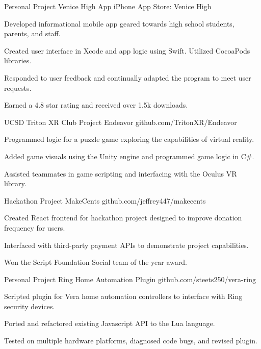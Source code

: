 \documentclass[]{awesome-cv}
\begin{document}
\vspace{-5mm}


\begin{cventries}
	\cventry
	{Personal Project}
	{Venice High App}
	{}
	{iPhone App Store: \textquotedbl{}Venice High\textquotedbl{}}
	{\begin{cvitems}
		\item {Developed informational mobile app geared towards high school students, parents, and staff.}
		\item {Created user interface in Xcode and app logic using Swift. Utilized CocoaPods libraries.}
		\item {Responded to user feedback and continually adapted the program to meet user requests.}
		\item {Earned a 4.8 star rating and received over 1.5k downloads.}
		\end{cvitems}}
	\cventry
	{UCSD Triton XR Club Project}
	{Endeavor}
	{}
	{github.com/TritonXR/Endeavor}
	{\begin{cvitems}
		\item {Programmed logic for a puzzle game exploring the capabilities of virtual reality.}
		\item {Added game visuals using the Unity engine and programmed game logic in C\#.}
		\item {Assisted teammates in game scripting and interfacing with the Oculus VR library.}
		\end{cvitems}}
	\cventry
	{Hackathon Project}
	{MakeCents}
	{}
	{github.com/jeffrey447/makecents}
	{\begin{cvitems}
		\item {Created React frontend for hackathon project designed to improve donation frequency for users.}
		\item {Interfaced with third-party payment APIs to demonstrate project capabilities.}
		\item {Won the Script Foundation Social team of the year award.}
		\end{cvitems}}
	\cventry
	{Personal Project}
	{Ring Home Automation Plugin}
	{}
	{github.com/steets250/vera-ring}
	{\begin{cvitems}
		\item {Scripted plugin for Vera home automation controllers to interface with Ring security devices.}
		\item {Ported and refactored existing Javascript API to the Lua language.}
		\item {Tested on multiple hardware platforms, diagnosed code bugs, and revised plugin.}
		\end{cvitems}}
\end{cventries}
\end{document}
